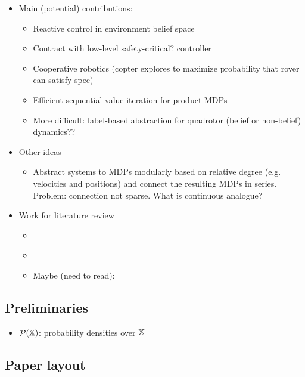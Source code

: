 \documentclass[conference]{IEEEtran}
\begin{document}
\begin{itemize}
  \item Main (potential) contributions:
  \begin{itemize}
    \item Reactive control in environment belief space
    \item Contract with low-level safety-critical? controller
    \item Cooperative robotics (copter explores to maximize probability that rover can satisfy spec)
    \item Efficient sequential value iteration for product MDPs
    \item More difficult: label-based abstraction for quadrotor (belief or non-belief) dynamics?? 
  \end{itemize}
  \item Other ideas
  \begin{itemize}
  	\item Abstract systems to MDPs modularly based on relative degree (e.g. velocities and positions) and connect the resulting MDPs in series. Problem: connection not sparse. What is continuous analogue?
  \end{itemize}
\end{itemize}

\begin{itemize}
  \item Work for literature review
  \begin{itemize}
    \item \cite{Papusha2016}
    \item \cite{Alora2016}
    \item Maybe (need to read): \cite{Lavaei2017}
  \end{itemize}
\end{itemize}

\subsection{Preliminaries}

\begin{itemize}
  \item $\mathcal P(\mathbb{X})$: probability densities over $\mathbb{X}$
\end{itemize}

\subsection{Paper layout}
\end{document}
